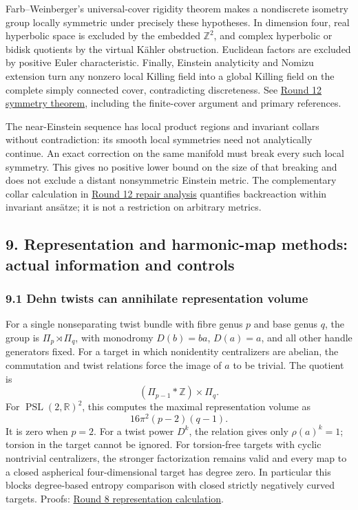 \documentclass[
  english,
]{article}
\begin{document}
Farb--Weinberger's universal-cover rigidity theorem makes a nondiscrete
isometry group locally symmetric under precisely these hypotheses. In
dimension four, real hyperbolic space is excluded by the embedded
\(\mathbb Z^2\), and complex hyperbolic or bidisk quotients by the
virtual Kähler obstruction. Euclidean factors are excluded by positive
Euler characteristic. Finally, Einstein analyticity and Nomizu extension
turn any nonzero local Killing field into a global Killing field on the
complete simply connected cover, contradicting discreteness. See
\href{../proofs/round12_symmetry.md}{Round 12 symmetry theorem},
including the finite-cover argument and primary references.

The near-Einstein sequence has local product regions and invariant
collars without contradiction: its smooth local symmetries need not
analytically continue. An exact correction on the same manifold must
break every such local symmetry. This gives no positive lower bound on
the size of that breaking and does not exclude a distant nonsymmetric
Einstein metric. The complementary collar calculation in
\href{../proofs/round12_repair.md}{Round 12 repair analysis} quantifies
backreaction within invariant ansätze; it is not a restriction on
arbitrary metrics.

\hypertarget{representation-and-harmonic-map-methods-actual-information-and-controls}{%
\subsection{9. Representation and harmonic-map methods: actual
information and
controls}\label{representation-and-harmonic-map-methods-actual-information-and-controls}}

\hypertarget{dehn-twists-can-annihilate-representation-volume}{%
\subsubsection{9.1 Dehn twists can annihilate representation
volume}\label{dehn-twists-can-annihilate-representation-volume}}

For a single nonseparating twist bundle with fibre genus \(p\) and base
genus \(q\), the group is \(\Pi_p\rtimes\Pi_q\), with monodromy
\(D(b)=ba\), \(D(a)=a\), and all other handle generators fixed. For a
target in which nonidentity centralizers are abelian, the commutation
and twist relations force the image of \(a\) to be trivial. The quotient
is \[
 (\Pi_{p-1}*\mathbb Z)\times\Pi_q.
\] For \(\operatorname{PSL}(2,\mathbb R)^2\), this computes the maximal
representation volume as \[
 16\pi^2(p-2)(q-1).
\] It is zero when \(p=2\). For a twist power \(D^k\), the relation
gives only \(\rho(a)^k=1\); torsion in the target cannot be ignored. For
torsion-free targets with cyclic nontrivial centralizers, the stronger
factorization remains valid and every map to a closed aspherical
four-dimensional target has degree zero. In particular this blocks
degree-based entropy comparison with closed strictly negatively curved
targets. Proofs: \href{../proofs/round8_construction.md}{Round 8
representation calculation}.
\end{document}

